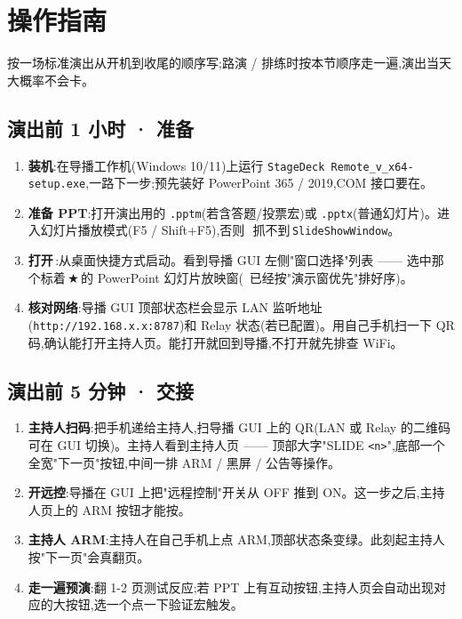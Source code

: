 \section{操作指南}

按一场标准演出从开机到收尾的顺序写;路演 / 排练时按本节顺序走一遍,演出当天大概率不会卡。

\subsection{演出前 1 小时 · 准备}

\begin{enumerate}
  \item \textbf{装机}:在导播工作机(Windows 10/11)上运行 \texttt{StageDeck Remote\_v\sdVersion\_x64-setup.exe},一路下一步;预先装好 PowerPoint 365 / 2019,COM 接口要在。
  \item \textbf{准备 PPT}:打开演出用的 \texttt{.pptm}(若含答题/投票宏)或 \texttt{.pptx}(普通幻灯片)。进入幻灯片播放模式(F5 / Shift+F5),否则\,\app\ 抓不到\,\texttt{SlideShowWindow}。
  \item \textbf{打开\,\app}:从桌面快捷方式启动。看到导播 GUI 左侧"窗口选择"列表 —— 选中那个标着\,$\bigstar$\,的 PowerPoint 幻灯片放映窗(\app\ 已经按"演示窗优先"排好序)。
  \item \textbf{核对网络}:导播 GUI 顶部状态栏会显示 LAN 监听地址(\texttt{http://192.168.x.x:8787})和 Relay 状态(若已配置)。用自己手机扫一下 QR 码,确认能打开主持人页。能打开就回到导播,不打开就先排查 WiFi。
\end{enumerate}

\subsection{演出前 5 分钟 · 交接}

\begin{enumerate}
  \item \textbf{主持人扫码}:把手机递给主持人,扫导播 GUI 上的 QR(LAN 或 Relay 的二维码可在 GUI 切换)。主持人看到主持人页 —— 顶部大字"SLIDE \texttt{<n>}",底部一个全宽"下一页"按钮,中间一排 ARM / 黑屏 / 公告等操作。
  \item \textbf{开远控}:导播在 GUI 上把"远程控制"开关从 OFF 推到 ON。这一步之后,主持人页上的 ARM 按钮才能按。
  \item \textbf{主持人 ARM}:主持人在自己手机上点 ARM,顶部状态条变绿。此刻起主持人按"下一页"会真翻页。
  \item \textbf{走一遍预演}:翻 1-2 页测试反应;若 PPT 上有互动按钮,主持人页会自动出现对应的大按钮,选一个点一下验证宏触发。
\end{enumerate}

